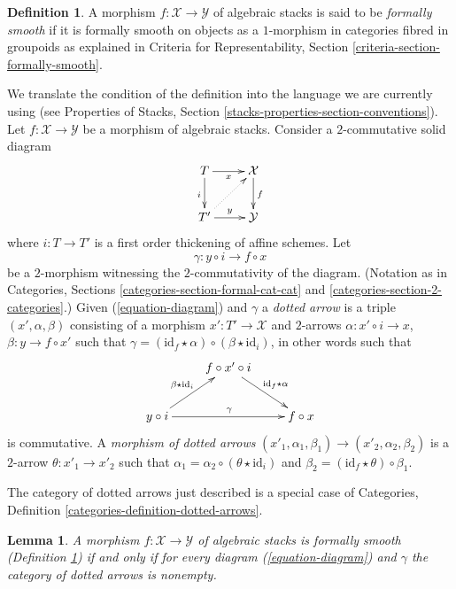 \documentclass{stacks-project}
\theoremstyle{plain}
\newtheorem{lemma}[subsection]{Lemma}
\theoremstyle{definition}
\newtheorem{definition}[subsection]{Definition}
\theoremstyle{remark}
\numberwithin{equation}{subsection}
\begin{document}
\begin{definition}
\label{definition-formally-smooth}
A morphism $f : \mathcal{X} \to \mathcal{Y}$ of algebraic stacks is said to be
{\it formally smooth} if it is formally smooth on objects as a
$1$-morphism in categories fibred in groupoids as explained in
Criteria for Representability, Section \ref{criteria-section-formally-smooth}.
\end{definition}

\noindent
We translate the condition of the definition into the language we are currently
using (see
Properties of Stacks, Section \ref{stacks-properties-section-conventions}).
Let $f : \mathcal{X} \to \mathcal{Y}$ be a morphism of algebraic stacks.
Consider a $2$-commutative solid diagram
\begin{equation}
\label{equation-diagram}
\vcenter{
\xymatrix{
T \ar[r]_-x \ar[d]_i & \mathcal{X} \ar[d]^f \\
T' \ar[r]^-y \ar@{..>}[ru] & \mathcal{Y}
}
}
\end{equation}
where $i : T \to T'$ is a first order thickening of affine schemes.
Let
$$
\gamma : y \circ i \longrightarrow f \circ x
$$
be a $2$-morphism witnessing the $2$-commutativity of the diagram.
(Notation as in Categories, Sections \ref{categories-section-formal-cat-cat}
and \ref{categories-section-2-categories}.)
Given (\ref{equation-diagram}) and $\gamma$
a {\it dotted arrow} is a triple $(x', \alpha, \beta)$ consisting of a
morphism $x' : T' \to \mathcal{X}$ and $2$-arrows
$\alpha : x' \circ i \to x$, $\beta : y \to f \circ x'$
such that
$\gamma = (\text{id}_f \star \alpha) \circ (\beta \star \text{id}_i)$,
in other words such that
$$
\xymatrix{
& f \circ x' \circ i \ar[rd]^{\text{id}_f \star \alpha} \\
y \circ i \ar[ru]^{\beta \star \text{id}_i} \ar[rr]^\gamma & &
f \circ x
}
$$
is commutative. A {\it morphism of dotted arrows}
$(x'_1, \alpha_1, \beta_1) \to (x'_2, \alpha_2, \beta_2)$ is a
$2$-arrow $\theta : x'_1 \to x'_2$ such that
$\alpha_1 = \alpha_2 \circ (\theta \star \text{id}_i)$ and
$\beta_2 = (\text{id}_f \star \theta) \circ \beta_1$.

\medskip\noindent
The category of dotted arrows just described is a special case of 
Categories, Definition \ref{categories-definition-dotted-arrows}.

\begin{lemma}
\label{lemma-reformulate-formal-smoothness}
A morphism $f : \mathcal{X} \to \mathcal{Y}$ of algebraic stacks is
formally smooth (Definition \ref{definition-formally-smooth})
if and only if for every diagram (\ref{equation-diagram}) and $\gamma$
the category of dotted arrows is nonempty.
\end{lemma}
\end{document}
